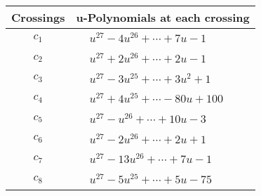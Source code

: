 \documentclass[1p]{elsarticle_modified}
\theoremstyle{definition}
\begin{document}
\begin{tabular}{m{50pt}|m{274pt}}
Crossings & \hspace{64pt}u-Polynomials at each crossing \\
\hline $$\begin{aligned}c_{1}\end{aligned}$$&$\begin{aligned}
&u^{27}-4 u^{26}+\cdots+7 u-1
\end{aligned}$\\
\hline $$\begin{aligned}c_{2}\end{aligned}$$&$\begin{aligned}
&u^{27}+2 u^{26}+\cdots+2 u-1
\end{aligned}$\\
\hline $$\begin{aligned}c_{3}\end{aligned}$$&$\begin{aligned}
&u^{27}-3 u^{25}+\cdots+3 u^2+1
\end{aligned}$\\
\hline $$\begin{aligned}c_{4}\end{aligned}$$&$\begin{aligned}
&u^{27}+4 u^{25}+\cdots-80 u+100
\end{aligned}$\\
\hline $$\begin{aligned}c_{5}\end{aligned}$$&$\begin{aligned}
&u^{27}- u^{26}+\cdots+10 u-3
\end{aligned}$\\
\hline $$\begin{aligned}c_{6}\end{aligned}$$&$\begin{aligned}
&u^{27}-2 u^{26}+\cdots+2 u+1
\end{aligned}$\\
\hline $$\begin{aligned}c_{7}\end{aligned}$$&$\begin{aligned}
&u^{27}-13 u^{26}+\cdots+7 u-1
\end{aligned}$\\
\hline $$\begin{aligned}c_{8}\end{aligned}$$&$\begin{aligned}
&u^{27}-5 u^{25}+\cdots+5 u-75
\end{aligned}$\\

\end{tabular}
\end{document}
